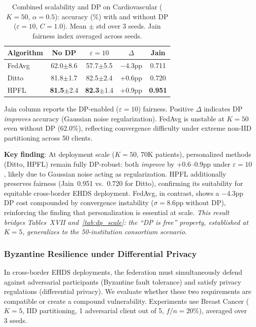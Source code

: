 \documentclass[conference]{IEEEtran}
\begin{document}
\begin{table}[htbp]
\centering
\caption{Combined scalability and DP on Cardiovascular ($K{=}50$, $\alpha{=}0.5$): accuracy (\%) with and without DP ($\varepsilon{=}10$, $C{=}1.0$). Mean $\pm$ std over 3 seeds. Jain fairness index averaged across seeds.}
\label{tab:dp_scale_cv}
\small
\begin{tabular}{lcccc}
\toprule
\textbf{Algorithm} & \textbf{No DP} & \textbf{$\varepsilon{=}10$} & \textbf{$\Delta$} & \textbf{Jain} \\
\midrule
FedAvg & 62.0{\tiny$\pm$8.6} & 57.7{\tiny$\pm$5.5} & $-$4.3pp & 0.711 \\
Ditto & 81.8{\tiny$\pm$1.7} & 82.5{\tiny$\pm$2.4} & +0.6pp & 0.720 \\
HPFL & \textbf{81.5}{\tiny$\pm$2.4} & \textbf{82.3}{\tiny$\pm$1.4} & +0.9pp & \textbf{0.951} \\
\bottomrule
\end{tabular}

\vspace{1mm}
\footnotesize{Jain column reports the DP-enabled ($\varepsilon{=}10$) fairness. Positive $\Delta$ indicates DP \textit{improves} accuracy (Gaussian noise regularization). FedAvg is unstable at $K{=}50$ even without DP (62.0\%), reflecting convergence difficulty under extreme non-IID partitioning across 50 clients.}
\end{table}

\textbf{Key finding}: At deployment scale ($K{=}50$, 70K patients), personalized methods (Ditto, HPFL) remain fully DP-robust: both \textit{improve} by +0.6--0.9pp under $\varepsilon{=}10$, likely due to Gaussian noise acting as regularization. HPFL additionally preserves fairness (Jain~0.951 vs.\ 0.720 for Ditto), confirming its suitability for equitable cross-border EHDS deployment. FedAvg, in contrast, shows a $-$4.3pp DP cost compounded by convergence instability ($\sigma{=}8.6$pp without DP), reinforcing the finding that personalization is essential at scale. \textit{This result bridges Tables~XVII and~\ref{tab:dp_scale}: the ``DP is free'' property, established at $K{=}5$, generalizes to the 50-institution consortium scenario.}

\subsubsection{Byzantine Resilience under Differential Privacy}\label{sec:byzantine_dp}

In cross-border EHDS deployments, the federation must simultaneously defend against adversarial participants (Byzantine fault tolerance) and satisfy privacy regulations (differential privacy). We evaluate whether these two requirements are compatible or create a compound vulnerability. Experiments use Breast Cancer ($K{=}5$, IID partitioning, 1 adversarial client out of 5, $f/n{=}20\%$), averaged over 3 seeds.
\end{document}
